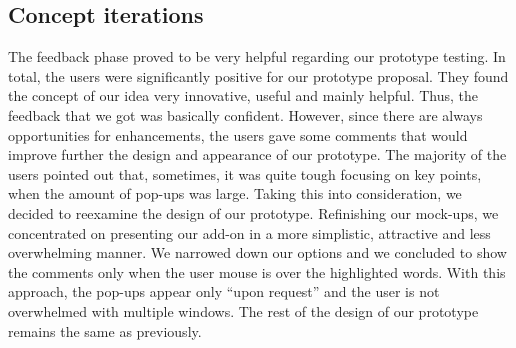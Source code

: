 \subsection{Concept iterations}

The feedback phase proved to be very helpful regarding our prototype testing. In 
total, the users were significantly positive for our prototype proposal. They 
found the concept of our  idea very innovative, useful and mainly helpful. Thus, 
the feedback that we got was basically confident. However, since there are 
always opportunities for enhancements, the users gave some comments that would 
improve further the design and appearance of our prototype. The majority of the 
users pointed out that, sometimes, it was quite tough focusing on key points, 
when the amount of pop-ups was large. Taking this into consideration, we decided 
to reexamine the design of our prototype. Refinishing our mock-ups, we 
concentrated on presenting our add-on in a more simplistic, attractive and less 
overwhelming manner. We narrowed down our options and we concluded to show the 
comments only when the user mouse is over the highlighted words. With this 
approach, the pop-ups appear only ``upon request'' and the user is not 
overwhelmed with multiple windows. The rest of the design of our prototype 
remains the same as previously. 
